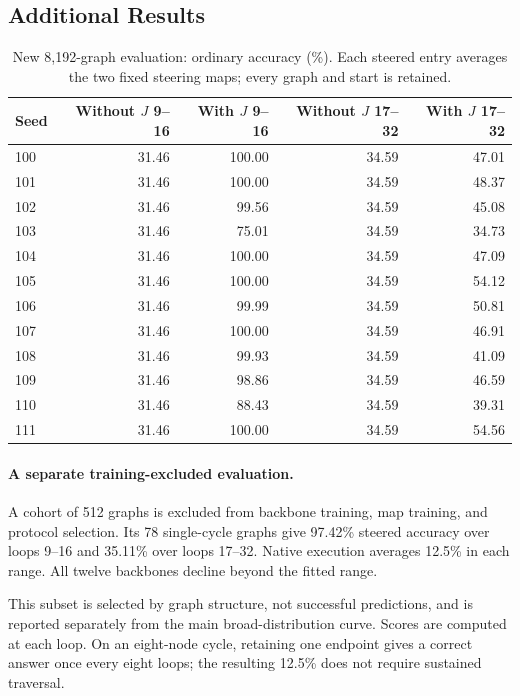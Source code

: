 \documentclass{article}
\begin{document}
\subsection{Additional Results}
\begin{table}[!htbp]\centering
\caption{New 8,192-graph evaluation: ordinary accuracy (\%). Each steered entry averages the two fixed steering maps; every graph and start is retained.}
\begin{tabular}{@{}lrrrr@{}}\toprule Seed & Without $J$ 9--16 & With $J$ 9--16 & Without $J$ 17--32 & With $J$ 17--32\\\midrule
100 & 31.46 & 100.00 & 34.59 & 47.01 \\
101 & 31.46 & 100.00 & 34.59 & 48.37 \\
102 & 31.46 & 99.56 & 34.59 & 45.08 \\
103 & 31.46 & 75.01 & 34.59 & 34.73 \\
104 & 31.46 & 100.00 & 34.59 & 47.09 \\
105 & 31.46 & 100.00 & 34.59 & 54.12 \\
106 & 31.46 & 99.99 & 34.59 & 50.81 \\
107 & 31.46 & 100.00 & 34.59 & 46.91 \\
108 & 31.46 & 99.93 & 34.59 & 41.09 \\
109 & 31.46 & 98.86 & 34.59 & 46.59 \\
110 & 31.46 & 88.43 & 34.59 & 39.31 \\
111 & 31.46 & 100.00 & 34.59 & 54.56 \\
\bottomrule\end{tabular}\end{table}

\paragraph{A separate training-excluded evaluation.}
A cohort of 512 graphs is excluded from backbone training, map training, and protocol selection. Its 78 single-cycle graphs give 97.42\% steered accuracy over loops 9--16 and 35.11\% over loops 17--32. Native execution averages 12.5\% in each range. All twelve backbones decline beyond the fitted range.

This subset is selected by graph structure, not successful predictions, and is reported separately from the main broad-distribution curve. Scores are computed at each loop. On an eight-node cycle, retaining one endpoint gives a correct answer once every eight loops; the resulting 12.5\% does not require sustained traversal.
\end{document}
